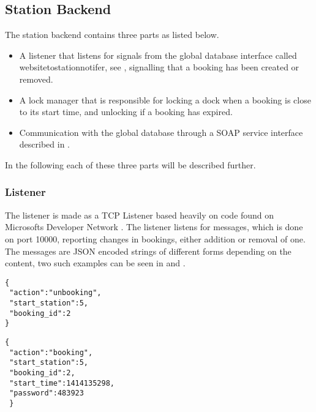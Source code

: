 \subsection{Station Backend}
The station backend contains three parts as listed below.
\begin{itemize}
	\item A listener that listens for signals from the global database interface called websitetostationnotifer, see , signalling that a booking has been created or removed.
	\item A lock manager that is responsible for locking a dock when a booking is close to its start time, and unlocking if a booking has expired.
	\item Communication with the global database through a SOAP service interface described in .
\end{itemize}

In the following each of these three parts will be described further.

\subsubsection{Listener}\label{subsubsec:listener}
The listener is made as a TCP Listener based heavily on code found on Microsofts Developer Network \citep{misc:TcpListenerSource}. 
The listener listens for messages, which is done on port 10000, reporting changes in bookings, either addition or removal of one. 
The messages are JSON encoded strings of different forms depending on the content, two such examples can be seen in  and .

\begin{minipage}{\textwidth}
\begin{minipage}{0.45\textwidth}
\begin{lstlisting}[caption = {Example of an unbooking message}, label = {lst:JsonUnbooking}]
{
 "action":"unbooking",
 "start_station":5,
 "booking_id":2
}
\end{lstlisting}
\end{minipage}
\hspace{0.5cm}
\begin{minipage}{0.45\textwidth}
\begin{lstlisting}[caption = {Example of a booking message}, label = {lst:JsonBooking}]
{
 "action":"booking",
 "start_station":5,
 "booking_id":2,
 "start_time":1414135298,
 "password":483923
 }
\end{lstlisting}
\end{minipage}
\end{minipage}

